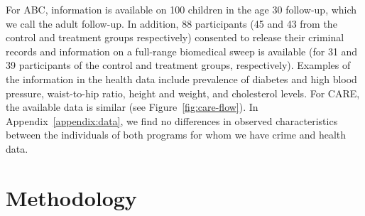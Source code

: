 \noindent For ABC, information is available on 100 children in the age 30 follow-up, which we call the adult follow-up. In addition, 88 participants (45 and 43 from the control and treatment groups respectively) consented to release their criminal records and information on a full-range biomedical sweep is available (for 31 and 39 participants of the control and treatment groups, respectively). Examples of the information in the health data include prevalence of diabetes and high blood pressure, waist-to-hip ratio, height and weight, and cholesterol levels. For CARE, the available data is similar (see Figure~\ref{fig:care-flow}). In Appendix~\ref{appendix:data}, we find no differences in observed characteristics between the individuals of both programs for whom we have crime and health data.

\section{Methodology} \label{section:methodology}

\clearpage
\singlespace



 